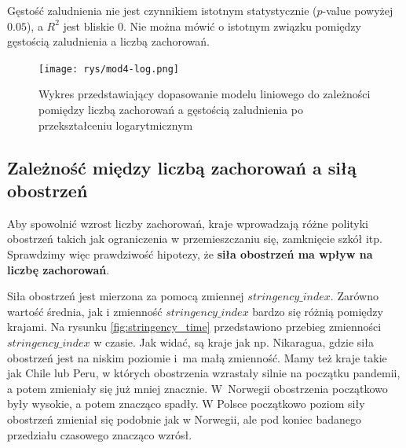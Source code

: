 \documentclass[12pt]{mwbk}
\theoremstyle{plain}
\theoremstyle{definition}
\theoremstyle{definition}
\newcommand\zrodlo[1]{\par\vspace{-3mm}{\small\textit{Źródło: }#1 }}
\begin{document}
Gęstość zaludnienia nie jest czynnikiem istotnym statystycznie ($p$-value powyżej $0.05$), a $R^2$ jest bliskie 0. Nie można mówić o istotnym związku pomiędzy gęstością zaludnienia a liczbą zachorowań.

\newpage

\begin{figure}[!h]
	\centering
	\texttt{[image: rys/mod4-log.png]}
	\caption{Wykres przedstawiający dopasowanie modelu liniowego do zależności pomiędzy liczbą zachorowań a gęstością zaludnienia po przekształceniu logarytmicznym }
	\label{fig:mod4-lin}
	\zrodlo{Opracowanie własne}
\end{figure}








\subsection{Zależność między liczbą zachorowań a siłą obostrzeń}

Aby spowolnić wzrost liczby zachorowań, kraje wprowadzają różne polityki obostrzeń takich jak ograniczenia w przemieszczaniu się, zamknięcie szkół itp. Sprawdzimy więc prawdziwość hipotezy, że \textbf{siła obostrzeń ma wpływ na liczbę zachorowań}.

Siła obostrzeń jest mierzona za pomocą zmiennej $stringency\_index$. Zarówno wartość średnia, jak i zmienność $stringency\_index$ bardzo się różnią pomiędzy krajami. Na rysunku \ref{fig:stringency_time} przedstawiono przebieg zmienności $stringency\_index$ w czasie. Jak widać, są kraje jak np. Nikaragua, gdzie siła obostrzeń jest na niskim poziomie i~ma małą zmienność. Mamy też kraje takie jak Chile lub Peru, w których obostrzenia wzrastały silnie na początku pandemii, a potem zmieniały się już mniej znacznie. W~Norwegii obostrzenia początkowo były wysokie, a potem znacząco spadły. W Polsce początkowo poziom siły obostrzeń zmieniał się podobnie jak w Norwegii, ale pod koniec badanego przedziału czasowego znacząco wzrósł.
 
\newpage
\end{document}
